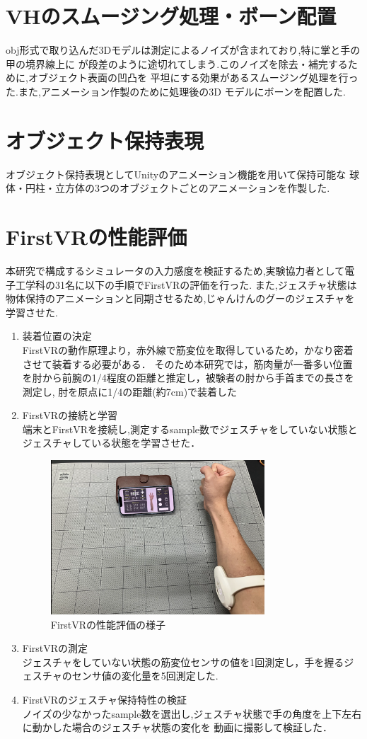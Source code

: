 \documentclass{ltjsreport}
\begin{document}
	\section{VHのスムージング処理・ボーン配置}
		obj形式で取り込んだ3Dモデルは測定によるノイズが含まれており,特に掌と手の甲の境界線上に
		が段差のように途切れてしまう.このノイズを除去・補完するために,オブジェクト表面の凹凸を
		平坦にする効果があるスムージング処理を行った.また,アニメーション作製のために処理後の3D
		モデルにボーンを配置した.

	
	\section{オブジェクト保持表現}
		オブジェクト保持表現としてUnityのアニメーション機能を用いて保持可能な
		球体・円柱・立方体の3つのオブジェクトごとのアニメーションを作製した.


	\section{FirstVRの性能評価}
		本研究で構成するシミュレータの入力感度を検証するため,実験協力者として電子工学科の31名に以下の手順でFirstVRの評価を行った.
		また,ジェスチャ状態は物体保持のアニメーションと同期させるため,じゃんけんのグーのジェスチャを学習させた.
		\begin{enumerate}
			\item 装着位置の決定\\
				FirstVRの動作原理より，赤外線で筋変位を取得しているため，かなり密着させて装着する必要がある．
				そのため本研究では，筋肉量が一番多い位置を肘から前腕の1/4程度の距離と推定し，被験者の肘から手首までの長さを測定し,
				肘を原点に1/4の距離(約7cm)で装着した
			\item FirstVRの接続と学習\\
				端末とFirstVRを接続し,測定するsample数でジェスチャをしていない状態とジェスチャしている状態を学習させた．
				\begin{figure}[H]
				\centering
				\includegraphics[width = 8cm]{../figs/IMG_5202.PNG}
				\caption{FirstVRの性能評価の様子}
				\label{fig:firstVRtest}
				\end{figure}
			\item FirstVRの測定\\
				ジェスチャをしていない状態の筋変位センサの値を1回測定し，手を握るジェスチャのセンサ値の変化量を5回測定した.
			\item FirstVRのジェスチャ保持特性の検証\\
				ノイズの少なかったsample数を選出し,ジェスチャ状態で手の角度を上下左右に動かした場合のジェスチャ状態の変化を
				動画に撮影して検証した．
		\end{enumerate}
\end{document}
